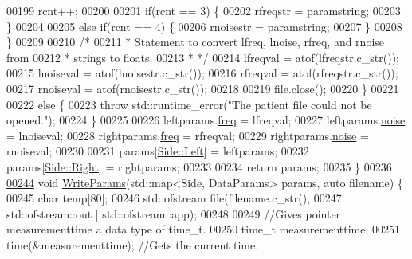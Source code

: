 \begin{DoxyCode}
00199                 rcnt++;
00200 
00201                 \textcolor{keywordflow}{if}(rcnt == 3) \{
00202                     rfreqstr = paramstring;
00203                 \}
00204 
00205                 \textcolor{keywordflow}{else} \textcolor{keywordflow}{if}(rcnt == 4) \{
00206                     rnoisestr = paramstring;
00207                 \}
00208             \}
00209 
00210             \textcolor{comment}{/*}
00211 \textcolor{comment}{             * Statement to convert lfreq, lnoise, rfreq, and rnoise from}
00212 \textcolor{comment}{             * strings to floats.}
00213 \textcolor{comment}{             * */}
00214             lfreqval = atof(lfreqstr.c\_str());
00215             lnoiseval = atof(lnoisestr.c\_str());
00216             rfreqval = atof(rfreqstr.c\_str());
00217             rnoiseval = atof(rnoisestr.c\_str());
00218 
00219             file.close();
00220         \}
00221 
00222         \textcolor{keywordflow}{else} \{
00223             \textcolor{keywordflow}{throw} std::runtime\_error(\textcolor{stringliteral}{"The patient file could not be opened."});
00224         \}
00225 
00226         leftparams.\hyperlink{structDataParams_a12566e017407647bc8287d62554ad3fb}{freq} = lfreqval;
00227         leftparams.\hyperlink{structDataParams_a4efd1d2231c6fa7c878c9d5e1650738f}{noise} = lnoiseval;
00228         rightparams.\hyperlink{structDataParams_a12566e017407647bc8287d62554ad3fb}{freq} = rfreqval;
00229         rightparams.\hyperlink{structDataParams_a4efd1d2231c6fa7c878c9d5e1650738f}{noise} = rnoiseval;
00230 
00231         params[\hyperlink{namespaceavda_af723e82f0d3d45fda6fdc01f6a492786a945d5e233cf7d6240f6b783b36a374ff}{Side::Left}] = leftparams;
00232         params[\hyperlink{namespaceavda_af723e82f0d3d45fda6fdc01f6a492786a92b09c7c48c520c3c55e497875da437c}{Side::Right}] = rightparams;
00233 
00234         \textcolor{keywordflow}{return} params;
00235     \}
00236 
\hypertarget{fileio_8hpp_source_l00244}{}\hyperlink{namespaceavda_a1e3f5a0eb4ee9a7010d57dc38bd8dfec}{00244}     \textcolor{keywordtype}{void} \hyperlink{namespaceavda_a1e3f5a0eb4ee9a7010d57dc38bd8dfec}{WriteParams}(std::map<Side, DataParams> params, \textcolor{keyword}{auto} filename) \{
00245         \textcolor{keywordtype}{char} temp[80];
00246         std::ofstream file(filename.c\_str(),
00247                 std::ofstream::out | std::ofstream::app);
00248 
00249         \textcolor{comment}{//Gives pointer measurementtime a data type of time\_t.}
00250         time\_t measurementtime;
00251         time(&measurementtime); \textcolor{comment}{//Gets the current time.}

\end{DoxyCode}
